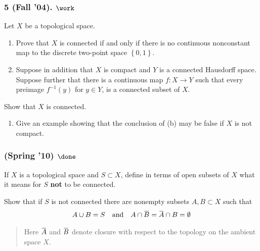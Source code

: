 \hypertarget{fall-04.-work}{%
\subsubsection{\texorpdfstring{5 (Fall '04).
\(\work\)}{5 (Fall '04). \textbackslash work}}\label{fall-04.-work}}

\begin{problem}[?]

Let \(X\) be a topological space.

\begin{enumerate}
\def\labelenumi{\alph{enumi}.}
\item
  Prove that \(X\) is connected if and only if there is no continuous
  nonconstant map to the discrete two-point space
  \(\left\{{0, 1}\right\}\).
\item
  Suppose in addition that \(X\) is compact and \(Y\) is a connected
  Hausdorff space. Suppose further that there is a continuous map
  \(f : X \to Y\) such that every preimage \(f^{-1}(y)\) for
  \(y \in Y\), is a connected subset of \(X\).
\end{enumerate}

Show that \(X\) is connected.

\begin{enumerate}
\def\labelenumi{\alph{enumi}.}
\setcounter{enumi}{2}
\tightlist
\item
  Give an example showing that the conclusion of (b) may be false if
  \(X\) is not compact.
\end{enumerate}

\end{problem}

\hypertarget{spring-10-done}{%
\subsubsection{\texorpdfstring{(Spring '10)
\(\done\)}{(Spring '10) \textbackslash done}}\label{spring-10-done}}

\begin{problem}[?]

If \(X\) is a topological space and \(S \subset X\), define in terms of
open subsets of \(X\) what it means for \(S\) \textbf{not} to be
connected.

Show that if \(S\) is not connected there are nonempty subsets
\(A, B \subset X\) such that
\begin{align*}
A \cup B = S {\quad \operatorname{and} \quad} A \cap \mkern 1.5mu\overline{\mkern-1.5muB\mkern-1.5mu}\mkern 1.5mu = \mkern 1.5mu\overline{\mkern-1.5muA\mkern-1.5mu}\mkern 1.5mu \cap B = \emptyset
\end{align*}

\begin{quote}
Here \(\mkern 1.5mu\overline{\mkern-1.5muA\mkern-1.5mu}\mkern 1.5mu\)
and \(\mkern 1.5mu\overline{\mkern-1.5muB\mkern-1.5mu}\mkern 1.5mu\)
denote closure with respect to the topology on the ambient space \(X\).
\end{quote}

\end{problem}


